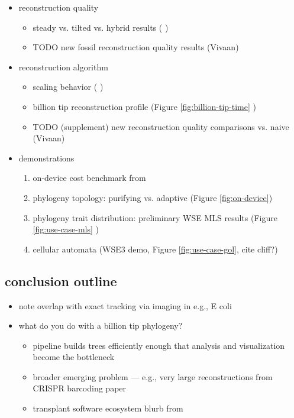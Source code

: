 \begin{itemize}
\item reconstruction quality
   \begin{itemize}
   \item steady vs. tilted vs. hybrid results ( \citep{moreno2025testing})
   \item TODO new fossil reconstruction quality results (Vivaan)
   \end{itemize}
\item reconstruction algorithm
   \begin{itemize}
  \item scaling behavior ( \citep{singhvi2025scalable})
   \item billion tip reconstruction profile (Figure \ref{fig:billion-tip-time} \citep{singhvi2025scalable})
   \item TODO (supplement) new reconstruction quality comparisons vs. naive (Vivaan)
   \end{itemize}
\item demonstrations
  \begin{enumerate}
  \item on-device cost benchmark from \citep{moreno2024trackable}
  \item phylogeny topology: purifying vs. adaptive (Figure \ref{fig:on-device}) \citep{moreno2024trackable}
  \item phylogeny trait distribution: preliminary WSE MLS results (Figure \ref{fig:use-case-mls} \citep{moreno2025extending})
  \item cellular automata (WSE3 demo, Figure \ref{fig:use-case-gol}, cite cliff?)
  \end{enumerate}
\end{itemize}

\subsection{conclusion outline}

\begin{itemize}
\item note overlap with exact tracking via imaging in e.g., E coli
\item what do you do with a billion tip phylogeny?
   \begin{itemize}
   \item pipeline builds trees efficiently enough that analysis and visualization become the bottleneck
   \item broader emerging problem --- e.g., very large reconstructions from CRISPR barcoding paper
   \item transplant software ecosystem blurb from \citep{singhvi2025scalable}
   \end{itemize}
\end{itemize}

